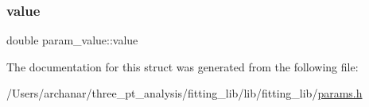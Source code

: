 \mbox{\label{structparam__value_adf404931755182278f4f8fef2ce21332}} 
\subsubsection{\texorpdfstring{value}{value}}
{\footnotesize\ttfamily double param\+\_\+value\+::value}



The documentation for this struct was generated from the following file\+:\begin{DoxyCompactItemize}
\item 
/\+Users/archanar/three\+\_\+pt\+\_\+analysis/fitting\+\_\+lib/lib/fitting\+\_\+lib/\mbox{\hyperlink{lib_2fitting__lib_2params_8h}{params.\+h}}\end{DoxyCompactItemize}
